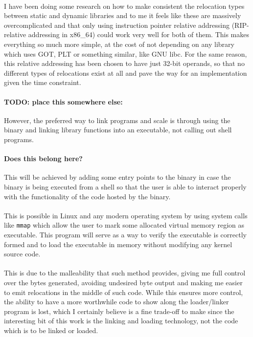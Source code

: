 \documentclass[12pt]{article}
\begin{document}
		\paragraph{}I have been doing some research on how to make consistent the relocation types between static and dynamic libraries and to me it feels like these are massively overcomplicated and that only using instruction pointer relative addressing (RIP-relative addressing in x86\_64) could work very well for both of them. This makes everything so much more simple, at the cost of not depending on any library which uses GOT, PLT or something similar, like GNU libc. For the same reason, this relative addressing has been chosen to have just 32-bit operands, so that no different types of relocations exist at all and pave the way for an implementation given the time constraint.
	\paragraph{TODO: place this somewhere else:}However, the preferred way to link programs and scale is through using the binary and linking library functions into an executable, not calling out shell programs.
	 \paragraph{Does this belong here?} This will be achieved by adding some entry points to the binary in case the binary is being executed from a shell so that the user is able to interact properly with the functionality of the code hosted by the binary.
	  \paragraph{}This is possible in Linux and any modern operating system by using system calls like \verb|mmap| which allow the user to mark some allocated virtual memory region as executable. This program will serve as a way to verify the executable is correctly formed and to load the executable in memory without modifying any kernel source code.
	  \paragraph{}This is due to the malleability that such method provides, giving me full control over the bytes generated, avoiding undesired byte output and making me easier to emit relocations in the middle of such code. While this ensures more control, the ability to have a more worthwhile code to show along the loader/linker program is lost, which I certainly believe is a fine trade-off to make since the interesting bit of this work is the linking and loading technology, not the code which is to be linked or loaded.
\end{document}
